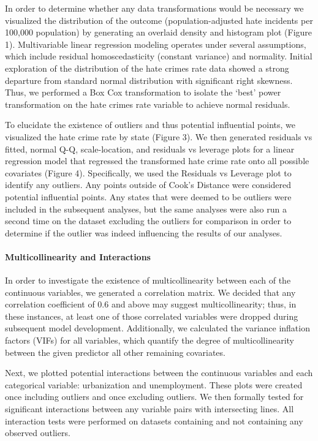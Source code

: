 \documentclass[
]{article}
\begin{document}
In order to determine whether any data transformations would be
necessary we visualized the distribution of the outcome
(population-adjusted hate incidents per 100,000 population) by
generating an overlaid density and histogram plot (Figure 1).
Multivariable linear regression modeling operates under several
assumptions, which include residual homoscedasticity (constant variance)
and normality. Initial exploration of the distribution of the hate
crimes rate data showed a strong departure from standard normal
distribution with significant right skewness. Thus, we performed a Box
Cox transformation to isolate the `best' power transformation on the
hate crimes rate variable to achieve normal residuals.

To elucidate the existence of outliers and thus potential influential
points, we visualized the hate crime rate by state (Figure 3). We then
generated residuals vs fitted, normal Q-Q, scale-location, and residuals
vs leverage plots for a linear regression model that regressed the
transformed hate crime rate onto all possible covariates (Figure 4).
Specifically, we used the Residuals vs Leverage plot to identify any
outliers. Any points outside of Cook's Distance were considered
potential influential points. Any states that were deemed to be outliers
were included in the subsequent analyses, but the same analyses were
also run a second time on the dataset excluding the outliers for
comparison in order to determine if the outlier was indeed influencing
the results of our analyses.

\hypertarget{multicollinearity-and-interactions}{%
\paragraph{Multicollinearity and
Interactions}\label{multicollinearity-and-interactions}}

In order to investigate the existence of multicollinearity between each
of the continuous variables, we generated a correlation matrix. We
decided that any correlation coefficient of 0.6 and above may suggest
multicollinearity; thus, in these instances, at least one of those
correlated variables were dropped during subsequent model development.
Additionally, we calculated the variance inflation factors (VIFs) for
all variables, which quantify the degree of multicollinearity between
the given predictor all other remaining covariates.

Next, we plotted potential interactions between the continuous variables
and each categorical variable: urbanization and unemployment. These
plots were created once including outliers and once excluding outliers.
We then formally tested for significant interactions between any
variable pairs with intersecting lines. All interaction tests were
performed on datasets containing and not containing any observed
outliers.
\end{document}
